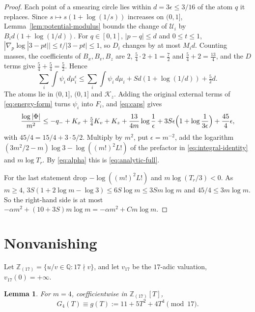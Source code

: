 \documentclass{amsart}
\newtheorem{lemma}{Lemma}[section]
\numberwithin{equation}{section}
\numberwithin{table}{section}
\newcommand{\Z}{\mathbb{Z}}
\begin{document}
\begin{proof}
Each point of a smearing circle lies within $d=3\epsilon\le3/16$ of the
atom $q$ it replaces. Since $s\mapsto s(1+\log(1/s))$ increases on $(0,1]$,
Lemma~\ref{lem:potential-modulus} bounds the change of $\mathcal U_i$ by
$B_id(1+\log(1/d))$. For $q\in[0,1]$, $|p-q|\le d$ and
$0\le t\le1$, $|\nabla_p\log|3-pt||\le t/|3-pt|\le1$, so $D_i$ changes by
at most $M_id$. Counting masses, the coefficients of $B_x,B_v,B_z$ are
$2$, $\frac54\cdot2+1=\frac72$ and $\frac54+2=\frac{13}4$, and the $D$ terms
give $\frac54+\frac54=\frac52$. Hence
\[
 \sum_i\int\psi_i\,d\mu_i^\epsilon
 \le\sum_i\int\psi_i\,d\mu_i+Sd(1+\log(1/d))+\tfrac52d.
\]
The atoms lie in $(0,1]$, $(0,1]$ and $\mathcal K_z$. Adding the original
external terms of \eqref{eq:energy-form} turns $\psi_i$ into $F_i$, and
\eqref{eq:caps} gives
\[
 \frac{\log|\Phi|}{m^2}\le-q_-+K_x+\tfrac54K_v+K_z
 +\frac{13}{4m}\log\frac1\epsilon+3S\epsilon\Bigl(1+\log\frac1{3\epsilon}\Bigr)
 +\frac{45}4\epsilon,
\]
with $45/4=15/4+3\cdot5/2$. Multiply by $m^2$, put $\epsilon=m^{-2}$, add
the logarithm $(3m^2/2-m)\log3-\log((m!)^2L!)$ of the prefactor in
\eqref{eq:integral-identity} and $m\log T_r$. By \eqref{eq:alpha} this is
\eqref{eq:analytic-full}.

For the last statement drop $-\log((m!)^2L!)$ and $m\log(T_r/3)<0$. As
$m\ge4$, $3S(1+2\log m-\log3)\le6S\log m\le3Sm\log m$ and
$45/4\le3m\log m$. So the right-hand side is at most
$-\alpha m^2+(10+3S)m\log m=-\alpha m^2+Cm\log m$.
\end{proof}

\section{Nonvanishing}\label{sec:nonvanishing}

Let $\Z_{(17)}=\{u/v\in\mathbb Q:17\nmid v\}$, and let $v_{17}$ be the
$17$-adic valuation, $v_{17}(0)=+\infty$.

\begin{lemma}\label{lem:g-mod-17}
For $m=4$, coefficientwise in $\Z_{(17)}[T]$,
\begin{equation}\label{eq:g-mod-17}
G_4(T)\equiv g(T):=11+5T^2+4T^4\pmod {17}.
\end{equation}
\end{lemma}
\end{document}
